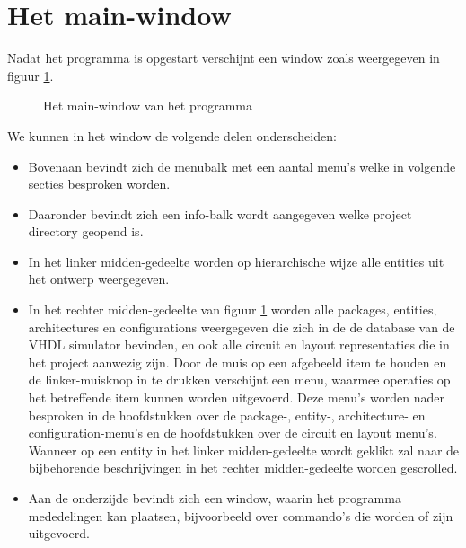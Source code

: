 \section{Het main-window}
Nadat het programma 
is opgestart verschijnt een window zoals weergegeven in figuur \ref{main-window}.
\begin{figure}[htb]
  \centerline{}
  \caption{Het main-window van het programma }
  \label{main-window}
\end{figure}
We kunnen in het window de volgende delen onderscheiden:
\begin{itemize}
\item Bovenaan bevindt zich de menubalk met een aantal menu's welke in volgende secties besproken worden.
\item Daaronder bevindt zich een info-balk wordt aangegeven welke project directory
      geopend is.
\item In het linker midden-gedeelte worden op hierarchische wijze alle entities uit het ontwerp weergegeven.
\item In het rechter midden-gedeelte van figuur \ref{main-window} worden  
      alle packages, entities, architectures en configurations weergegeven die zich in de 
      de database van de VHDL simulator bevinden, en ook alle circuit en layout representaties
      die in het project aanwezig zijn.
      Door de muis op een afgebeeld item te houden en de linker-muisknop in te drukken
      verschijnt een menu, waarmee operaties op het betreffende item
      kunnen worden uitgevoerd. Deze menu's worden nader besproken in de
      hoofdstukken over de package-, entity-, architecture- en configuration-menu's
      en de hoofdstukken over de circuit en layout menu's.
      Wanneer op een entity in het linker midden-gedeelte wordt geklikt zal naar de
      bijbehorende beschrijvingen in het rechter midden-gedeelte worden gescrolled.
\item Aan de onderzijde bevindt zich een window, waarin het programma
      mededelingen kan plaatsen, bijvoorbeeld over commando's die worden of zijn
      uitgevoerd.
\end{itemize}

